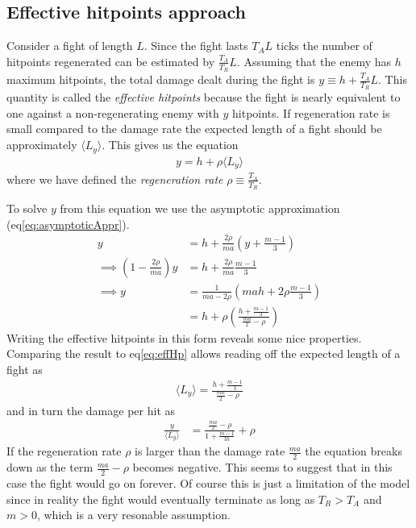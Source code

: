 \subsection{Effective hitpoints approach}

Consider a fight of length $L$. Since the fight lasts $T_A L$ ticks the number of hitpoints regenerated can be estimated by $\frac{T_A}{T_R} L$. Assuming that the enemy has $h$ maximum hitpoints, the total damage dealt during the fight is $y \equiv h + \frac{T_A}{T_R} L$. This quantity is called the \textit{effective hitpoints} because the fight is nearly equivalent to one against a non-regenerating enemy with $y$ hitpoints. If regeneration rate is small compared to the damage rate the expected length of a fight should be approximately $\langle L_y \rangle$. This gives us the equation
\begin{align}\label{eq:effHp}
	y = h + \rho\langle L_y \rangle
\end{align}
where we have defined the \textit{regeneration rate} $\rho \equiv \frac{T_A}{T_R}$.

To solve $y$ from this equation we use the asymptotic approximation (eq\ref{eq:asymptoticAppr}).
\begin{align}
	y &= h + \frac{2\rho}{ma} \left(y + \frac{m-1}{3}\right)\nonumber\\
	\implies \left(1 - \frac{2\rho}{ma}\right) y &= h + \frac{2\rho}{ma} \frac{m-1}{3}\nonumber\\
	\implies y
		&= \frac{1}{ma - 2\rho}\left(mah + 2\rho \frac{m-1}{3}\right)\nonumber\\
		&= h + \rho\left(\frac{h + \frac{m-1}{3}}{\frac{ma}{2} - \rho}\right)
\end{align}
Writing the effective hitpoints in this form reveals some nice properties. Comparing the result to eq\ref{eq:effHp} allows reading off the expected length of a fight as
\begin{align}
	\langle L_y \rangle = \frac{h + \frac{m-1}{3}}{\frac{ma}{2} - \rho}
\end{align}
and in turn the damage per hit as
\begin{align}
	\frac{y}{\langle L_y \rangle}
		&= \frac{\frac{ma}{2} - \rho}{1 + \frac{m-1}{3h}} + \rho
\end{align}
If the regeneration rate $\rho$ is larger than the damage rate $\frac{ma}{2}$ the equation breaks down as the term $\frac{ma}{2} - \rho$ becomes negative. This seems to suggest that in this case the fight would go on forever. Of course this is just a limitation of the model since in reality the fight would eventually terminate as long as $T_R > T_A$ and $m > 0$, which is a very resonable assumption.
